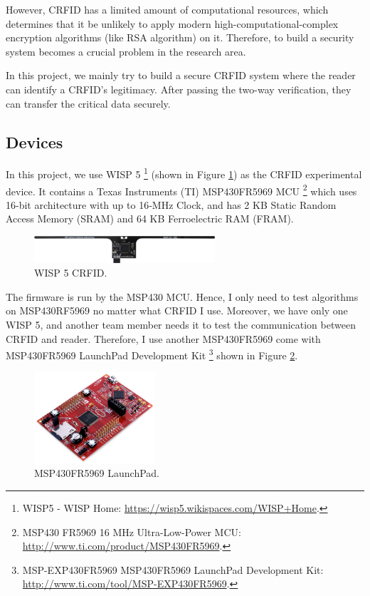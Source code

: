 \documentclass[sigconf, review=false]{acmart}
\let\OldTexttrademark\texttrademark
\renewcommand{\texttrademark}{\OldTexttrademark\xspace}%
\begin{document}
However, CRFID has a limited amount of computational resources, which determines that it be unlikely to apply
modern high-computational-complex encryption algorithms (like RSA algorithm) on it.
Therefore, to build a security system becomes a crucial problem in the research area.

In this project, we mainly try to build a secure CRFID system
where the reader can identify a CRFID's legitimacy.
After passing the two-way verification, they can transfer the critical data securely.

\subsection{Devices}
In this project, we use WISP 5 \footnote{WISP5 - WISP Home: \url{https://wisp5.wikispaces.com/WISP+Home}.} (shown in Figure \ref{fig-wisp5})
as the CRFID experimental device.
It contains a Texas Instruments (TI) MSP430FR5969 MCU \footnote{MSP430\texttrademark FR5969 16 MHz Ultra-Low-Power MCU: \url{http://www.ti.com/product/MSP430FR5969}.}
which uses 16-bit architecture with up to 16‑MHz Clock, and has 2 KB Static Random Access Memory (SRAM) and 64 KB Ferroelectric RAM (FRAM).

\begin{figure}
\centering
\includegraphics[width=0.6\textwidth]{wisp5.png}
\caption{WISP 5 CRFID.}
\label{fig-wisp5}
\end{figure}

The firmware is run by the MSP430 MCU. Hence, I only need to test algorithms on MSP430RF5969 no matter what CRFID I use.
Moreover, we have only one WISP 5, and another team member needs it to test the communication between CRFID and reader.
Therefore, I use another MSP430FR5969 come with MSP430FR5969 LaunchPad Development Kit
\footnote{MSP-EXP430FR5969 MSP430FR5969 LaunchPad Development Kit: \url{http://www.ti.com/tool/MSP-EXP430FR5969}.}
shown in Figure \ref{fig-launchpad}.

\begin{figure}
\centering
\includegraphics[width=0.4\textwidth]{launchpad.jpg}
\caption{MSP430FR5969 LaunchPad.}
\label{fig-launchpad}
\end{figure}
\end{document}
